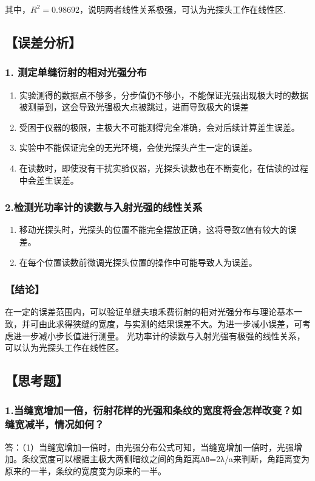 \documentclass[12pt,a4paper,UTF8]{ctexart}
\begin{document}
其中，$R^2=0.98692$，说明两者线性关系极强，可认为光探头工作在线性区.


\subsection*{【误差分析】}
\subsubsection*{1. 测定单缝衍射的相对光强分布}
\begin{enumerate}
	\item	实验测得的数据点不够多，分步值仍不够小，不能保证光强出现极大时的数据被测量到，这会导致光强极大点被跳过，进而导致极大的误差
    \item   受困于仪器的极限，主极大不可能测得完全准确，会对后续计算差生误差。
    \item   实验中不能保证完全的无光环境，会使光探头产生一定的误差。
    \item   在读数时，即使没有干扰实验仪器，光探头读数也在不断变化，在估读的过程中会差生误差。
\end{enumerate}
\subsubsection*{2.检测光功率计的读数与入射光强的线性关系}
\begin{enumerate}
	\item 	移动光探头时，光探头的位置不能完全摆放正确，这将导致Z值有较大的误差。
	\item 在每个位置读数前微调光探头位置的操作中可能导致人为误差。
\end{enumerate}

\subsubsection*{【结论】}
	在一定的误差范围内，可以验证单缝夫琅禾费衍射的相对光强分布与理论基本一致，并可由此求得狭缝的宽度，与实测的结果误差不大。为进一步减小误差，可考虑进一步减小步长值进行测量。
	光功率计的读数与入射光强有极强的线性关系，可以认为光探头工作在线性区。


\newpage
\subsection*{【思考题】}

\subsubsection*{1.当缝宽增加一倍，衍射花样的光强和条纹的宽度将会怎样改变？如缝宽减半，情况如何？}
答：（1）当缝宽增加一倍时，由光强分布公式可知，当缝宽增加一倍时，光强增加。条纹宽度可以根据主极大两侧暗纹之间的角距离∆θ=2λ/a来判断，角距离变为原来的一半，条纹的宽度变为原来的一半。
\end{document}
